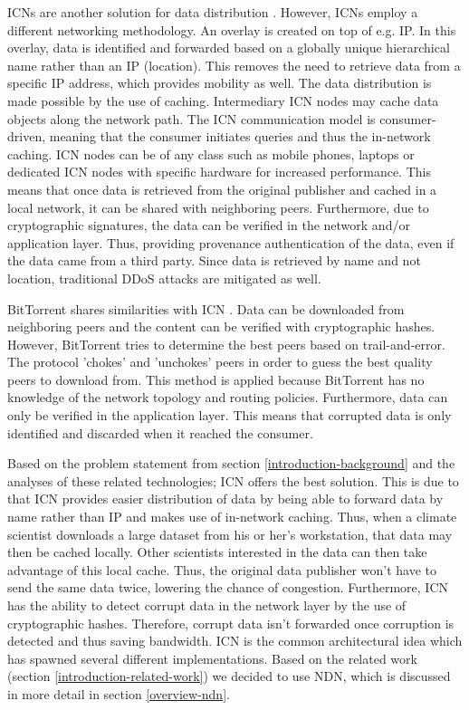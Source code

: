 ICNs are another solution for data distribution \cite{jacobson2009networking}. However, ICNs employ a different networking methodology. An overlay is created on top of e.g. IP. In this overlay, data is identified and forwarded based on a globally unique hierarchical name rather than an IP (location). This removes the need to retrieve data from a specific IP address, which provides mobility as well. The data distribution is made possible by the use of caching. Intermediary ICN nodes may cache data objects along the network path. The ICN communication model is consumer-driven, meaning that the consumer initiates queries and thus the in-network caching. ICN nodes can be of any class such as mobile phones, laptops or dedicated ICN nodes with specific hardware for increased performance. This means that once data is retrieved from the original publisher and cached in a local network, it can be shared with neighboring peers. Furthermore, due to cryptographic signatures, the data can be verified in the network and/or application layer. Thus, providing provenance authentication of the data, even if the data came from a third party. Since data is retrieved by name and not location, traditional DDoS attacks are mitigated as well.

BitTorrent shares similarities with ICN \cite{mastorakis2017ntorrent}. Data can be downloaded from neighboring peers and the content can be verified with cryptographic hashes. However, BitTorrent tries to determine the best peers based on trail-and-error. The protocol 'chokes' and 'unchokes' peers in order to guess the best quality peers to download from. This method is applied because BitTorrent has no knowledge of the network topology and routing policies. Furthermore, data can only be verified in the application layer. This means that corrupted data is only identified and discarded when it reached the consumer. 

Based on the problem statement from section \ref{introduction-background} and the analyses of these related technologies; ICN offers the best solution. This is due to that ICN provides easier distribution of data by being able to forward data by name rather than IP and makes use of in-network caching. Thus, when a climate scientist downloads a large dataset from his or her's workstation, that data may then be cached locally. Other scientists interested in the data can then take advantage of this local cache. Thus, the original data publisher won't have to send the same data twice, lowering the chance of congestion. Furthermore, ICN has the ability to detect corrupt data in the network layer by the use of cryptographic hashes. Therefore, corrupt data isn't forwarded once corruption is detected and thus saving bandwidth. ICN is the common architectural idea which has spawned several different implementations. Based on the related work (section \ref{introduction-related-work}) we decided to use NDN, which is discussed in more detail in section \ref{overview-ndn}.


